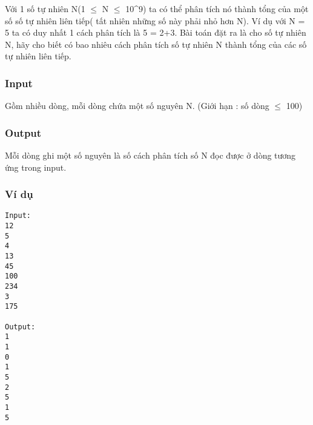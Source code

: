 



   Với 1 số tự nhiên N(1 $\le$  N  $\le$  10^9) ta có thể phân tích nó thành tổng của một số số tự nhiên liên tiếp( tất nhiên những số này phải nhỏ hơn N). Ví dụ với N = 5 ta có duy nhất 1 cách phân tích là 5 = 2+3.      Bài toán đặt ra là cho số tự nhiên N, hãy cho biết có bao nhiêu cách phân tích số tự nhiên N thành tổng của các số tự nhiên liên tiếp.  

\subsubsection{   Input  }

   Gồm nhiều dòng, mỗi dòng chứa một số nguyên N. (Giới hạn : số dòng  $\le$  100)  

\subsubsection{   Output  }

   Mỗi dòng ghi một số nguyên là số cách phân tích số N đọc được ở dòng tương ứng trong input.  

\subsubsection{   Ví dụ  }
\begin{verbatim}
Input:
12
5
4
13
45
100
234
3
175

Output:
1
1
0
1
5
2
5
1
5
\end{verbatim}
